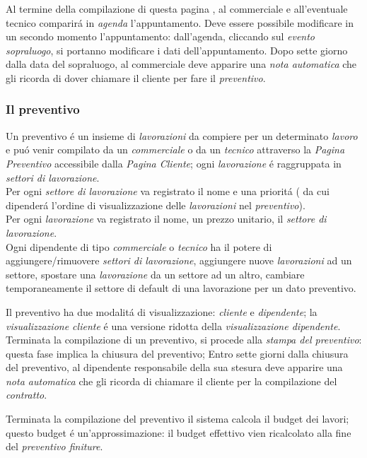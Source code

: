 \documentclass[paper=a4, fontsize=11pt]{scrartcl} %
\numberwithin{equation}{section} %
\numberwithin{figure}{section} %
\numberwithin{table}{section} %
\begin{document}
Al termine della compilazione di questa pagina , al commerciale e all'eventuale tecnico comparir\'a in \textit{agenda}
l'appuntamento.
Deve essere possibile modificare in un secondo momento l'appuntamento:
dall'agenda, cliccando sul \textit{evento sopraluogo}, si portanno modificare i dati dell'appuntamento.
Dopo sette giorno dalla data del sopraluogo, al commerciale deve apparire una \textit{nota automatica} che gli
ricorda di dover chiamare il cliente per fare il \textit{preventivo}.

\subsubsection{Il preventivo}
Un preventivo \'e un insieme di \textit{lavorazioni} da compiere per un determinato \textit{lavoro}
e pu\'o venir compilato da un \textit{commerciale} o da un \textit{tecnico} attraverso la \textit{Pagina Preventivo}
accessibile dalla \textit{Pagina Cliente};
ogni \textit{lavorazione} \'e raggruppata in \textit{settori di lavorazione}.\\
 Per ogni \textit{settore di lavorazione} va registrato il nome e una priorit\'a
 ( da cui dipender\'a l'ordine di visualizzazione delle \textit{lavorazioni} nel \textit{preventivo}).\\
Per ogni \textit{lavorazione}  va registrato il nome, un prezzo unitario, il \textit{settore di lavorazione}.\\
Ogni dipendente di tipo \textit{commerciale} o \textit{tecnico} ha il potere di aggiungere/rimuovere \textit{settori di lavorazione},
aggiungere nuove \textit{lavorazioni} ad un settore, spostare una \textit{lavorazione} da un settore ad un altro,
cambiare temporaneamente il settore di default di una lavorazione per un dato preventivo.



Il preventivo ha due modalit\'a di visualizzazione: \textit{cliente} e \textit{dipendente}; la \textit{visualizzazione cliente}
\'e una versione ridotta della \textit{visualizzazione dipendente}.\\

Terminata la compilazione di un preventivo, si procede alla \textit{stampa del preventivo}:
questa fase implica la chiusura del preventivo;
Entro sette giorni dalla chiusura del preventivo, al dipendente responsabile della sua stesura
 deve apparire una \textit{nota automatica} che gli ricorda di chiamare il cliente per la
 compilazione del \textit{contratto}.

Terminata la compilazione del preventivo il sistema calcola il budget
dei lavori; questo budget \'e un'approssimazione: il budget effettivo
vien ricalcolato alla fine del \textit{preventivo finiture}.\\
\end{document}
